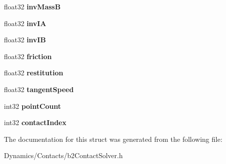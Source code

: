 \begin{DoxyCompactItemize}
\item 
\mbox{\label{structb2ContactVelocityConstraint_ac75c816e94402ed4d93f232d211d4f62}} 
float32 {\bfseries inv\+MassB}
\item 
\mbox{\label{structb2ContactVelocityConstraint_ac6c18706a9ee89c5a682dc610e86e00f}} 
float32 {\bfseries inv\+IA}
\item 
\mbox{\label{structb2ContactVelocityConstraint_aae02d4fd8f60353385b9cc876dc78a81}} 
float32 {\bfseries inv\+IB}
\item 
\mbox{\label{structb2ContactVelocityConstraint_a11025786ae828eeeb60dfcd15358d934}} 
float32 {\bfseries friction}
\item 
\mbox{\label{structb2ContactVelocityConstraint_a6734f74c1970abc64ed7dcffd8737257}} 
float32 {\bfseries restitution}
\item 
\mbox{\label{structb2ContactVelocityConstraint_aaf6acabb0ef62eeac647250e2520a272}} 
float32 {\bfseries tangent\+Speed}
\item 
\mbox{\label{structb2ContactVelocityConstraint_a1decd7bf6a5dc61bd72d4e87b070a660}} 
int32 {\bfseries point\+Count}
\item 
\mbox{\label{structb2ContactVelocityConstraint_a4c76b9292f28859e2f8c9d075e79b873}} 
int32 {\bfseries contact\+Index}
\end{DoxyCompactItemize}


The documentation for this struct was generated from the following file\+:\begin{DoxyCompactItemize}
\item 
Dynamics/\+Contacts/b2\+Contact\+Solver.\+h\end{DoxyCompactItemize}
